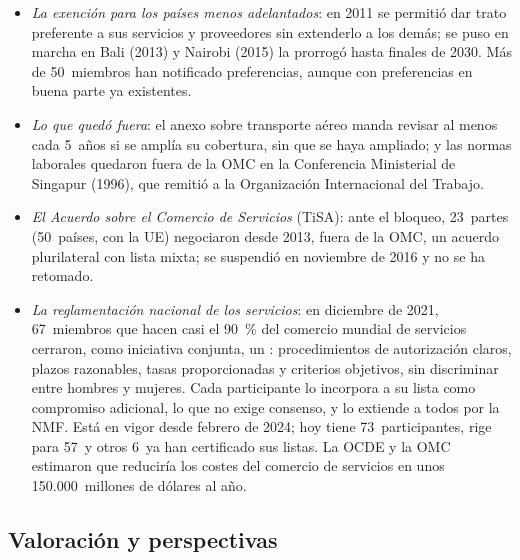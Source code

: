 \documentclass[11pt]{article}
\begin{document}
\begin{itemize}
\begin{itemize}
\begin{itemize}
    \end{itemize}
  \end{itemize}
\item \emph{La exención para los países menos adelantados}: en 2011 se permitió dar trato preferente a sus servicios y proveedores sin extenderlo a los demás; se puso en marcha en Bali (2013) y Nairobi (2015) la prorrogó hasta finales de 2030. Más de 50~miembros han notificado preferencias, aunque con preferencias en buena parte ya existentes\nocite{OMC2026ServiciosPMA}.
\item \emph{Lo que quedó fuera}: el anexo sobre transporte aéreo manda revisar al menos cada 5~años si se amplía su cobertura, sin que se haya ampliado; y las normas laborales quedaron fuera de la OMC en la Conferencia Ministerial de Singapur (1996), que remitió a la Organización Internacional del Trabajo\nocite{OMC1996Singapur}.
\item \emph{El Acuerdo sobre el Comercio de Servicios} (TiSA): ante el bloqueo, 23~partes (50~países, con la UE) negociaron desde 2013, fuera de la OMC, un acuerdo plurilateral con lista mixta; se suspendió en noviembre de 2016 y no se ha retomado\nocite{CE2026TiSA}.
\item \emph{La reglamentación nacional de los servicios}: en diciembre de 2021, 67~miembros que hacen casi el 90~\% del comercio mundial de servicios cerraron, como iniciativa conjunta, un : procedimientos de autorización claros, plazos razonables, tasas proporcionadas y criterios objetivos, sin discriminar entre hombres y mujeres. Cada participante lo incorpora a su lista como compromiso adicional, lo que no exige consenso, y lo extiende a todos por la NMF. Está en vigor desde febrero de 2024; hoy tiene 73~participantes, rige para 57~y otros 6~ya han certificado sus listas\nocite{OMC2026ReglamentacionNacional}. La OCDE y la OMC estimaron que reduciría los costes del comercio de servicios en unos 150.000~millones de dólares al año\nocite{OCDEOMC2021SDR}.
\end{itemize}

\subsection{Valoración y perspectivas}\label{sec:agcs-valoracion}
\end{document}
